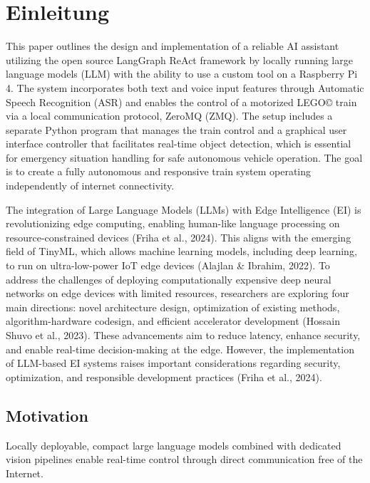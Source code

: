 \chapter{Einleitung}
\label{ch:intro}


This paper outlines the design and implementation of a reliable AI assistant utilizing the open source LangGraph ReAct framework by locally running large language models (LLM) with the ability to use a custom tool on a Raspberry Pi 4. The system incorporates both text and voice input features through Automatic Speech Recognition (ASR) and enables the control of a motorized LEGO© train via a local communication protocol, ZeroMQ (ZMQ). The setup includes a separate Python program that manages the train control and a graphical user interface controller that facilitates real-time object detection, which is essential for emergency situation handling for safe autonomous vehicle operation. The goal is to create a fully autonomous and responsive train system operating independently of internet connectivity.

The integration of Large Language Models (LLMs) with Edge Intelligence (EI) is revolutionizing edge computing, enabling human-like language processing on resource-constrained devices (Friha et al., 2024). This aligns with the emerging field of TinyML, which allows machine learning models, including deep learning, to run on ultra-low-power IoT edge devices (Alajlan & Ibrahim, 2022). To address the challenges of deploying computationally expensive deep neural networks on edge devices with limited resources, researchers are exploring four main directions: novel architecture design, optimization of existing methods, algorithm-hardware codesign, and efficient accelerator development (Hossain Shuvo et al., 2023). These advancements aim to reduce latency, enhance security, and enable real-time decision-making at the edge. However, the implementation of LLM-based EI systems raises important considerations regarding security, optimization, and responsible development practices (Friha et al., 2024).

%
%
\section{Motivation}
\label{sec:intro:motivation}

Locally deployable, compact large language models combined with dedicated vision pipelines enable real-time control through direct communication free of the Internet.

